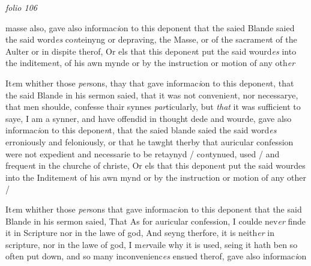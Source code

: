 \documentclass[12pt, a4paper]{book}
\begin{document}
\textit{folio 106}


 	
 		
		\ifthenelse{\isodd{\thepage}}
		{\reversemarginpar}
		{\normalmarginpar}
		masse also, gave also informac\textit{i}on to this deponent
 			that the saied Blande saied the said word\textit{es} co\textit{n}teinyng
 or depraving, the Masse, or of the sacrame\textit{n}t of the Aulter
 or in dispite therof, Or els that this depone\textit{n}t put
 the said wourd\textit{es} into the inditeme\textit{n}t, of his awn mynde
 or by the instruction or motion of any oth\textit{er}



				\marginpar[\vspace{0.5cm}{\textcolor{Gray}{5}}]{}
			
	
		\ifthenelse{\isodd{\thepage}}
		{\reversemarginpar}
		{\normalmarginpar}
		 It\textit{e}m whither those \textit{per}sons, thay that gave informac\textit{i}on to
		this depone\textit{n}t, that the said Blande in his sermon
 saied, that it was not convenie\textit{n}t, nor necessarye, that
 men shoulde, confesse thair synnes \textit{par}ticularly, but \textit{that}
 it was sufficient to saye, I am a synner, and have
 offendid in thought dede and wourde, gave also informac\textit{i}on
		to this depone\textit{n}t, that the saied blande saied the said word\textit{es}
 erroniously and feloniously, or that he tawght therby
 that auricular confession were not expedient and
 necessarie to be retaynyd / co\textit{n}tynued, used / and freque\textit{n}t
 in the churche of christe, Or els that this depone\textit{n}t
 put the said wourdes into the Inditeme\textit{n}t of his awn mynd
 or by the instruction or motion of any other /





				\marginpar[\vspace{0.5cm}{\textcolor{Gray}{6}}]{}
			
	
		\ifthenelse{\isodd{\thepage}}
		{\reversemarginpar}
		{\normalmarginpar}
		 It\textit{e}m whither those \textit{per}sons that gave informac\textit{i}on to this depone\textit{n}t
		that the said Blande in his sermon saied, That As for
 auricular confession, I coulde nev\textit{er} finde it in Scripture
 nor in the lawe of god, And seyng therfore, it is neith\textit{er}
 in scripture, nor in the lawe of god, I m\textit{er}vaile why it
 is used, seing it hath ben so often put down, and so many
 inconvenienc\textit{es} ensued therof, gave also informac\textit{i}on
\end{document}
